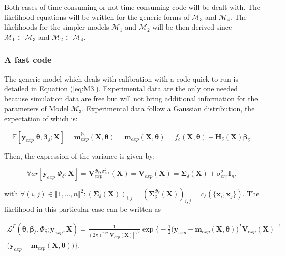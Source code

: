 \documentclass[soumission]{jsfds}
\newcommand{\EqRef}[1] {Equation (\ref{#1})}
\edef\hc{\string: }
\newcommand{\PB}[1]{\textcolor{green}{PB: #1}}
\begin{document}
Both cases of time consuming or not time consuming code will be dealt with. The likelihood equations will be written for the generic forms of $\mathcal{M}_3$ and $\mathcal{M}_4$. The likelihoods for the simpler models
$\mathcal{M}_1$ and $\mathcal{M}_2$ 
will be then derived since  
$\mathcal{M}_1\subset\mathcal{M}_3$ and $\mathcal{M}_2\subset\mathcal{M}_4$.\newline

\subsubsection{A fast code}

\noindent The generic model which deals with calibration with a code quick to run is detailed in \EqRef{eq:M3}. Experimental data are the only one needed because simulation data are free but will not bring additional information for the parameters of Model $\mathcal{M}_3$.
Experimental data follow a Gaussian distribution, the expectation of which
is\hc \newline

\begin{equation*}
\mathbb{E}[\boldsymbol{y}_{exp}|\boldsymbol{\theta},\boldsymbol{\beta}_{\delta};\boldsymbol{X}] = \boldsymbol{m}_{exp}^{\boldsymbol{\beta}_{\delta}}(\boldsymbol{X},\boldsymbol{\theta}) = \boldsymbol{m}_{exp}(\boldsymbol{X},\boldsymbol{\theta}) = f_c(\boldsymbol{X},\boldsymbol{\theta}) + {\boldsymbol{H}_{\delta}}(\boldsymbol{X})\boldsymbol{\beta}_{\delta}.
\end{equation*}

Then, the expression of the variance is given by\hc

\begin{equation*}
\mathbb{V}ar[\boldsymbol{y}_{exp}|\Phi_{\delta};\boldsymbol{X}] = \boldsymbol{V}_{exp}^{\Phi_{\delta},\sigma_{err}^2}(\boldsymbol{X})= \boldsymbol{V}_{exp}(\boldsymbol{X}) = \boldsymbol{\Sigma}_{\delta}(\boldsymbol{X}) + \sigma_{err}^2\boldsymbol{I}_n,
\end{equation*}

with $\forall (i,j) \in \llbracket1,\dots,n\rrbracket^2: (\boldsymbol{\Sigma}_{\delta}(\boldsymbol{X}))_{i,j} =(\boldsymbol{\Sigma}^{\Phi_{\delta}}_{\delta}(\boldsymbol{X}))_{i,j}= c_{\delta}(\{\boldsymbol{x}_i,\boldsymbol{x}_j\})$. 
The likelihood in this particular case can be written as

\begin{equation}
\begin{split}
\mathcal{L}^{F}(\boldsymbol{\theta},\boldsymbol{\beta}_{\delta},\Phi_{\delta};\boldsymbol{y}_{exp},\boldsymbol{X})=\frac{1}{(2\pi)^{n/2}|\boldsymbol{V}_{exp}(\boldsymbol{X})|^{1/2}}\exp\Bigg\{-\frac{1}{2}\Big(\boldsymbol{y}_{exp}-\boldsymbol{m}_{exp}(\boldsymbol{X},\boldsymbol{\theta})\Big)^T\boldsymbol{V}_{exp}(\boldsymbol{X})^{-1}\\
\Big(\boldsymbol{y}_{exp}-\boldsymbol{m}_{exp}(\boldsymbol{X},\boldsymbol{\theta})\Big)\Bigg\}.
\end{split}
\label{eq:LikelihoodQuick2}
\end{equation}
\end{document}
